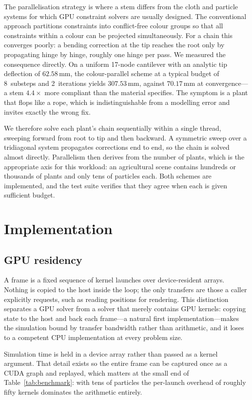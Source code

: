 \documentclass[conference]{IEEEtran}
\begin{document}
The parallelisation strategy is where a stem differs from the cloth and
particle systems for which GPU constraint solvers are usually designed. The
conventional approach partitions constraints into conflict-free colour groups
so that all constraints within a colour can be projected simultaneously. For a
chain this converges poorly: a bending correction at the tip reaches the root
only by propagating hinge by hinge, roughly one hinge per pass. We measured
the consequence directly. On a uniform 17-node cantilever with an analytic tip
deflection of $62.58$\,mm, the colour-parallel scheme at a typical budget of
8~substeps and 2~iterations yields $307.53$\,mm, against $70.17$\,mm at
convergence---a stem $4.4\times$ more compliant than the material specifies.
The symptom is a plant that flops like a rope, which is indistinguishable from
a modelling error and invites exactly the wrong fix.

We therefore solve each plant's chain sequentially within a single thread,
sweeping forward from root to tip and then backward. A symmetric sweep over a
tridiagonal system propagates corrections end to end, so the chain is solved
almost directly. Parallelism then derives from the number of plants, which is
the appropriate axis for this workload: an agricultural scene contains
hundreds or thousands of plants and only tens of particles each. Both schemes
are implemented, and the test suite verifies that they agree when each is
given sufficient budget.

\section{Implementation}
\label{sec:impl}

\subsection{GPU residency}

A frame is a fixed sequence of kernel launches over device-resident arrays.
Nothing is copied to the host inside the loop; the only transfers are those a
caller explicitly requests, such as reading positions for rendering. This
distinction separates a GPU solver from a solver that merely contains GPU
kernels: copying state to the host and back each frame---a natural first
implementation---makes the simulation bound by transfer bandwidth rather than
arithmetic, and it loses to a competent CPU implementation at every problem
size.

Simulation time is held in a device array rather than passed as a kernel
argument. That detail exists so the entire frame can be captured once as a
CUDA graph and replayed, which matters at the small end of
Table~\ref{tab:benchmark}: with tens of particles the per-launch overhead of
roughly fifty kernels dominates the arithmetic entirely.
\end{document}
